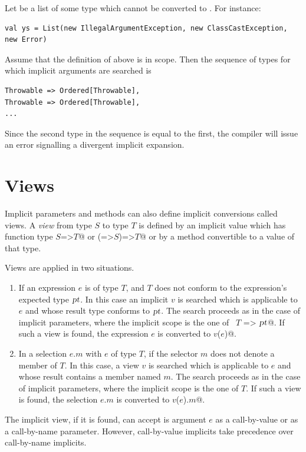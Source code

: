 \example Let  be a list of some type which cannot be converted
to . For instance:
\begin{lstlisting}
val ys = List(new IllegalArgumentException, new ClassCastException, new Error)
\end{lstlisting}
Assume that the definition of  above is in scope. Then the sequence
of types for which implicit arguments are searched is 
\begin{lstlisting}
Throwable => Ordered[Throwable],
Throwable => Ordered[Throwable],
...
\end{lstlisting}
Since the second type in the sequence is equal to the first, the compiler
will issue an error signalling a divergent implicit expansion.

\section{Views}\label{sec:views}

Implicit parameters and methods can also define implicit conversions
called views. A {\em view} from type $S$ to type $T$ is
defined by an implicit value which has function type
\lstinline@$S$=>$T$@ or \lstinline@(=>$S$)=>$T$@ or by a method convertible to a value of that
type.

Views are applied in two situations.
\begin{enumerate}
\item
If an expression $e$ is of type $T$, and $T$ does not conform to the
expression's expected type $\mbox{\sl pt}$. In this case an implicit $v$ is
searched which is applicable to $e$ and whose result type conforms to
$\mbox{\sl pt}$.  The search proceeds as in the case of implicit parameters,
where the implicit scope is the one of ~\lstinline@$T$ => $\mbox{\sl pt}$@. If
such a view is found, the expression $e$ is converted to
\lstinline@$v$($e$)@. 
\item
In a selection $e.m$ with $e$ of type $T$, if the selector $m$ does
not denote a member of $T$.  In this case, a view $v$ is searched
which is applicable to $e$ and whose result contains a member named
$m$.  The search proceeds as in the case of implicit parameters, where
the implicit scope is the one of $T$.  If such a view is found, the
selection $e.m$ is converted to \lstinline@$v$($e$).$m$@.
\end{enumerate}
The implicit view, if it is found, can accept is argument $e$ as a
call-by-value or as a call-by-name parameter. However, call-by-value
implicits take precedence over call-by-name implicits.

